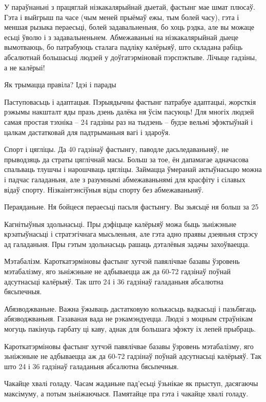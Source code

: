 У параўнаньні з працяглай нізкакалярыйнай дыетай, фастынг мае шмат плюсаў. Гэта і выйгрыш па часе (чым меней прыёмаў ежы, тым болей часу), гэта і меншая рызыка пераесьці, болей задавальненьня, бо хоць рэдка, але вы можаце есьці ўволю і з задавальненьнем. Абмежаваньні на нізкакалярыйнай дыеце вымотваюць, бо патрабуюць сталага падліку калёрыяў, што складана рабіць абсалютнай большасьці людзей у доўгатэрміновай пэрспэктыве. Лічыце гадзіны, а не калёрыі!

Як трымацца правіла? Ідэі і парады

Паступовасьць і адаптацыя.
Пэрыядычны фастынг патрабуе адаптацыі, жорсткія рэжымы накшталт яды празь дзень далёка ня ўсім пасуюць! Для многіх людзей самая простая тэхніка – 24 гадзіны раз на тыдзень – будзе вельмі эфэктыўнай і цалкам дастатковай для падтрыманьня вагі і здароўя.

Спорт і цягліцы.
Да 40 гадзінаў фастынгу, паводле дасьледаваньняў, не прыводзяць да страты цяглічнай масы. Больш за тое, ён дапамагае адначасова спальваць тлушчы і нарошчваць цягліцы. Займацца ўмеранай актыўнасьцю можна і падчас галаданьня, але з разумнымі абмежаваньнямі для красфіту і сілавых відаў спорту. Нізкаінтэнсіўныя віды спорту без абмежаваньняў.

Пераяданьне.
Ня бойцеся пераесьці пасьля фастынгу. Вы зьясьцё ня больш за 25%

Кагнітыўныя здольнасьці.
Пры дэфіцыце калёрыяў можа быць зьніжэньне крэатыўнасьці і стратэгічнага мысьленьня, але гэта адно праявы дзеяньня стрэсу ад галаданьня. Пры гэтым здольнасьць рашаць дэталёвыя задачы захоўваецца.

Мэтабалізм.
Кароткатэрміновы фастынг хутчэй павялічвае базавы ўзровень мэтабалізму, яго зьніжэньне не адбываецца аж да 60-72 гадзінаў поўнай адсутнасьці калёрыяў. Так што 24 і 36 гадзінаў галаданьня абсалютна бясьпечныя.

Абязводжваньне.
Важна ўжываць дастатковую колькасьць вадкасьці і пазьбягаць абязводжваньня. Газаваная вада не рэкамэндуецца. Людзі з моцным страўнікам могуць пакінуць гарбату ці каву, аднак для большага эфэкту іх лепей прыбраць.

Кароткатэрміновы фастынг хутчэй павялічвае базавы ўзровень мэтабалізму, яго зьніжэньне не адбываецца аж да 60-72 гадзінаў поўнай адсутнасьці калёрыяў. Так што 24 і 36 гадзінаў галаданьня абсалютна бясьпечныя.

Чакайце хвалі голаду.
Часам жаданьне пад'есьці ўзьнікае як прыступ, дасягаючы максімуму, а потым зьніжаючыся. Памятайце пра гэта і чакайце хвалі голаду.

